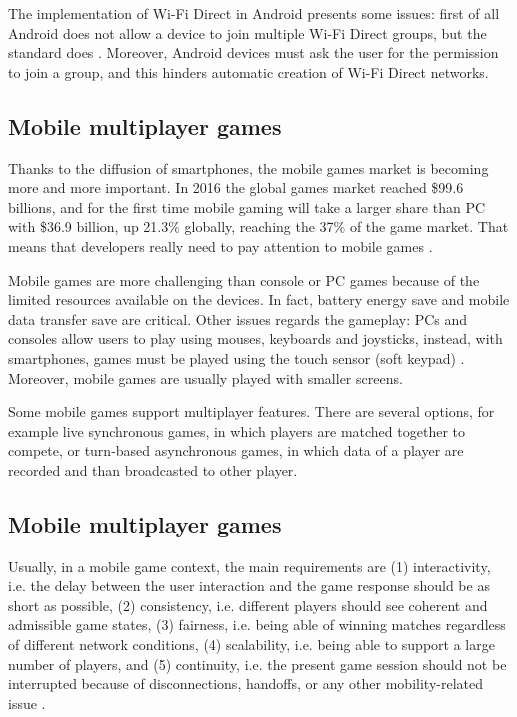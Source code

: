 The implementation of Wi-Fi Direct in Android presents some issues: first of all
Android does not allow a device to join multiple Wi-Fi Direct groups,
but the standard does \cite{bib:android-wifidirect-limits}. Moreover, Android 
devices must ask the user for the permission to join a group, and this hinders 
automatic creation of Wi-Fi Direct networks.

\subsection{Mobile multiplayer games}
Thanks to the diffusion of smartphones, the mobile games market is becoming
more and more important. In 2016 the global games market reached \$99.6 billions, and 
for the first time mobile gaming will take a larger share than PC with \$36.9 billion, 
up 21.3\% globally, reaching the 37\% of the game market. That means that developers 
really need to pay attention to mobile games \cite{bib:newzoo2}.

Mobile games are more challenging than console or PC games because of the limited 
resources available on the devices. In fact, battery energy save and mobile data 
transfer save are critical. Other issues regards the gameplay: PCs and consoles 
allow users to play using mouses, keyboards and joysticks, instead, with smartphones, 
games must be played using the touch sensor (soft keypad) \cite{bib:mobile-input-devices}. 
Moreover, mobile games are usually played with smaller screens.

Some mobile games support multiplayer features. There are several options, for 
example live synchronous games, in which players are matched together to compete, 
or turn-based asynchronous games, in which data of a player are recorded and than 
broadcasted to other player.

\subsection{Mobile multiplayer games}
Usually, in a mobile game context, the main requirements are (1)
interactivity, i.e. the delay between the user interaction and the game
response should be as short as possible, (2) consistency, i.e. different
players should see coherent and admissible game states, (3) fairness, i.e.
being able of winning matches regardless of different network conditions, (4)
scalability, i.e. being able to support a large number of players, and (5)
continuity, i.e. the present game session should not be interrupted because
of disconnections, handoffs, or any other mobility-related issue
\cite{bib:interactive-mobile-gaming}.

